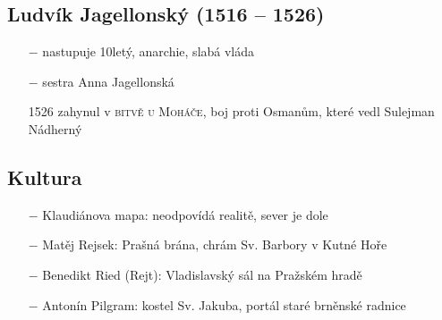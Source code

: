 \documentclass{article}
\begin{document}
\subsection*{Ludvík Jagellonský (1516 – 1526)}
\begin{itemize}
    \vspace{-0.5em}
    \setlength\itemsep{0.15em}
    \item[$-$] nastupuje 10letý, anarchie, slabá vláda
    \item[$-$] sestra Anna Jagellonská
    \item[1526] zahynul v \textsc{bitvě u Moháče}, boj proti Osmanům, které vedl Sulejman Nádherný


\end{itemize}

\subsection*{Kultura}
\begin{itemize}
    \vspace{-0.5em}
    \setlength\itemsep{0.15em}
    \item[$-$] Klaudiánova mapa: neodpovídá realitě, sever je dole
    \item[$-$] Matěj Rejsek: Prašná brána, chrám Sv. Barbory v Kutné Hoře
    \item[$-$] Benedikt Ried (Rejt): Vladislavský sál na Pražském hradě
    \item[$-$] Antonín Pilgram: kostel Sv. Jakuba, portál staré brněnské radnice
\end{itemize}
\end{document}
